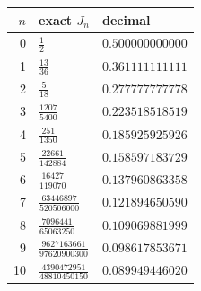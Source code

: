\begin{tabular}{rll}
\toprule
$n$ & exact $J_n$ & decimal \\
\midrule
0 & $\frac{1}{2}$ & $0.500000000000$ \\
1 & $\frac{13}{36}$ & $0.361111111111$ \\
2 & $\frac{5}{18}$ & $0.277777777778$ \\
3 & $\frac{1207}{5400}$ & $0.223518518519$ \\
4 & $\frac{251}{1350}$ & $0.185925925926$ \\
5 & $\frac{22661}{142884}$ & $0.158597183729$ \\
6 & $\frac{16427}{119070}$ & $0.137960863358$ \\
7 & $\frac{63446897}{520506000}$ & $0.121894650590$ \\
8 & $\frac{7096441}{65063250}$ & $0.109069881999$ \\
9 & $\frac{9627163661}{97620900300}$ & $0.098617853671$ \\
10 & $\frac{4390472951}{48810450150}$ & $0.089949446020$ \\
\bottomrule
\end{tabular}
